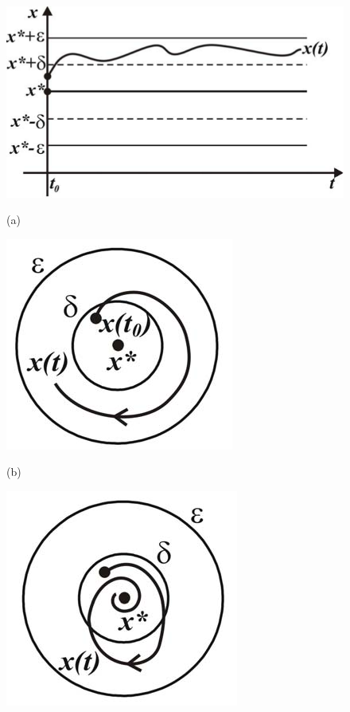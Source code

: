 \begin{figure}[h!]
        \centering
        \begin{minipage}{\linewidth}
             \centering
             \includegraphics[]{fig/lect3/2a}

             (a)
        \end{minipage}
        \begin{minipage}{0.49\linewidth}
             \centering
             \includegraphics[]{fig/lect3/2b} 

             (b)
        \end{minipage}
        \begin{minipage}{0.49\linewidth}
             \centering
             \includegraphics[]{fig/lect3/2c}


\end{minipage}
\end{figure}
